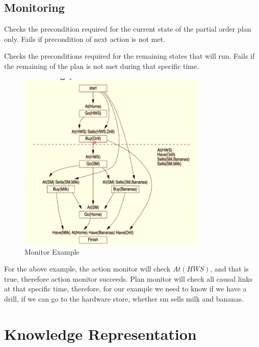 \documentclass[a4paper]{article}
\theoremstyle{plain}
\theoremstyle{definition}
\newtheorem{defn}{Definition}[section]
\theoremstyle{remark}
\begin{document}
\subsection{Monitoring}
\begin{tcolorbox}[colback=black!3!white,colframe=black!60!white,title=\begin{defn}Action Monitoring \label{Action Monitoring}\end{defn}]
Checks the precondition required for the current state of the partial order plan only. Fails if precondition of next action is not met.
\end{tcolorbox}
\begin{tcolorbox}[colback=black!3!white,colframe=black!60!white,title=\begin{defn}Plan Monitoring \label{Plan Monitoring}\end{defn}]
Checks the preconditions required for the remaining states that will run. Fails if the remaining of the plan is not met during that specific time.
\end{tcolorbox}
\begin{figure}[H]
	\centering
	\includegraphics[width=0.8\textwidth]{monitor.png}
	\caption{Monitor Example}
	\label{fig:monitor-png}
\end{figure}
For the above example, the action monitor will check $At(HWS)$, and that is true, therefore action monitor succeeds. Plan monitor will check all causal links at that specific time, therefore, for our example we need to know if we have a drill, if we can go to the hardware store, whether sm sells milk and bananas.
\section{Knowledge Representation}
\end{document}
